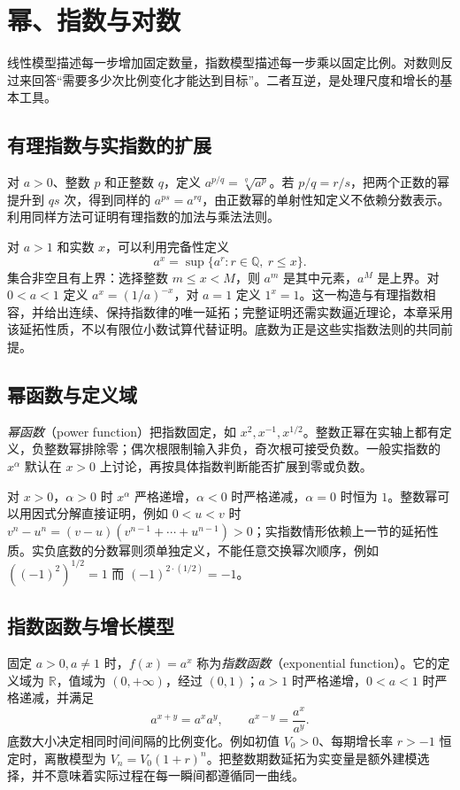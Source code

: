\setcounter{chapter}{7} %
\chapter{幂、指数与对数}
\label{chap:em-exponential}
线性模型描述每一步增加固定数量，指数模型描述每一步乘以固定比例。对数则反过来回答“需要多少次比例变化才能达到目标”。二者互逆，是处理尺度和增长的基本工具。

\section{有理指数与实指数的扩展}
对 $a>0$、整数 $p$ 和正整数 $q$，定义 $a^{p/q}=\sqrt[q]{a^p}$。若 $p/q=r/s$，把两个正数的幂提升到 $qs$ 次，得到同样的 $a^{ps}=a^{rq}$，由正数幂的单射性知定义不依赖分数表示。利用同样方法可证明有理指数的加法与乘法法则。

对 $a>1$ 和实数 $x$，可以利用完备性定义
\[
 a^x=\sup\{a^r:r\in\mathbb Q,\ r\le x\}.
\]
集合非空且有上界：选择整数 $m\le x<M$，则 $a^m$ 是其中元素，$a^M$ 是上界。对 $0<a<1$ 定义 $a^x=(1/a)^{-x}$，对 $a=1$ 定义 $1^x=1$。这一构造与有理指数相容，并给出连续、保持指数律的唯一延拓；完整证明还需实数逼近理论，本章采用该延拓性质，不以有限位小数试算代替证明。底数为正是这些实指数法则的共同前提。

\section{幂函数与定义域}
\emph{幂函数}（power function）把指数固定，如 $x^2,x^{-1},x^{1/2}$。整数正幂在实轴上都有定义，负整数幂排除零；偶次根限制输入非负，奇次根可接受负数。一般实指数的 $x^\alpha$ 默认在 $x>0$ 上讨论，再按具体指数判断能否扩展到零或负数。

对 $x>0$，$\alpha>0$ 时 $x^\alpha$ 严格递增，$\alpha<0$ 时严格递减，$\alpha=0$ 时恒为 $1$。整数幂可以用因式分解直接证明，例如 $0<u<v$ 时 $v^n-u^n=(v-u)(v^{n-1}+\cdots+u^{n-1})>0$；实指数情形依赖上一节的延拓性质。实负底数的分数幂则须单独定义，不能任意交换幂次顺序，例如 $((-1)^2)^{1/2}=1$ 而 $(-1)^{2\cdot(1/2)}=-1$。

\section{指数函数与增长模型}
固定 $a>0,a\ne1$ 时，$f(x)=a^x$ 称为\emph{指数函数}（exponential function）。它的定义域为 $\mathbb R$，值域为 $(0,+\infty)$，经过 $(0,1)$；$a>1$ 时严格递增，$0<a<1$ 时严格递减，并满足
\[
 a^{x+y}=a^xa^y,\qquad a^{x-y}=\frac{a^x}{a^y}.
\]
底数大小决定相同时间间隔的比例变化。例如初值 $V_0>0$、每期增长率 $r>-1$ 恒定时，离散模型为 $V_n=V_0(1+r)^n$。把整数期数延拓为实变量是额外建模选择，并不意味着实际过程在每一瞬间都遵循同一曲线。

